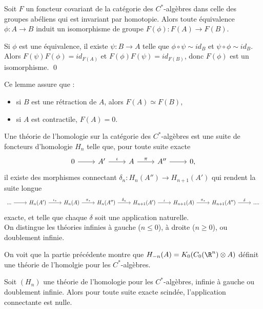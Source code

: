 \begin{prop}
Soit $F$ un foncteur covariant de la catégorie des $C^*$-algèbres dans celle des groupes abéliens qui est invariant par homotopie. Alors toute équivalence $\phi: A \rightarrow B$ induit un isomorphisme de groupe $F(\phi):F(A)\rightarrow F(B)$.
\end{prop}

\begin{dem} Si $\phi$ est une équivalence, il existe $\psi : B\rightarrow A $ telle que $\phi \circ \psi \sim id_B $ et $\psi\circ \phi\sim id_B$. Alors $F(\psi)F(\phi)=id_{F(A)}$ et $F(\phi)F(\psi)=id_{F(B)}$, donc $F(\phi)$ est un isomorphisme. \qed
\end{dem}

Ce lemme assure que :
\begin{itemize}
\item si $B$ est une rétraction de $A$, alors $F(A)\simeq F(B)$,
\item si $A$ est contractile, $F(A)=0$.
\end{itemize}

\begin{definition}
Une théorie de l'homologie sur la catégorie des $C^*$-algèbres est une suite de foncteurs d'homologie $H_n$ telle que, pour toute suite exacte 
\[\begin{tikzcd}
0\arrow{r} & A' \arrow{r}{\iota} & A \arrow{r}{\pi} & A'' \arrow{r} & 0,
\end{tikzcd}\]
il existe des morphismes connectant $\delta_n : H_n(A'')\rightarrow H_{n+1}(A')$ qui rendent la suite longue 
\[\begin{tikzcd}
...\arrow{r} & H_n( A') \arrow{r}{\iota_*} & H_n(A) \arrow{r}{\pi_*} & H_n(A'') \arrow{r}{\delta_n} & H_{n+1}(A')\arrow{r}{\iota} & H_{n+1}(A) \arrow{r}{\pi_*} & H_{n+1}(A'')\arrow{r}{\delta}& ....
\end{tikzcd}\]
exacte, et telle que chaque $\delta$ soit une application naturelle. \\
On distingue les théories infinies à gauche ($n\leq 0$), à droite ($n\geq 0$), ou doublement infinie. 
\end{definition}

On voit que la partie précédente montre que $H_{-n}(A)=K_0(C_0(\R^n)\otimes A)$ définit une théorie de l'homolgie pour les $C^*$-algèbres.\\

\begin{prop}
Soit $(H_n)$ une théorie de l'homologie pour les $C^*$-algèbres, infinie à gauche ou doublement infinie. Alors pour toute suite exacte scindée, l'application connectante est nulle. 
\end{prop}

